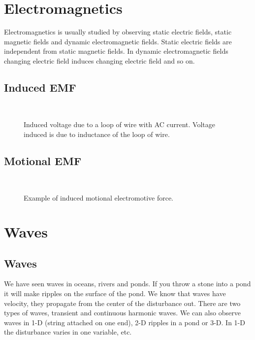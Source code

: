 \section{Electromagnetics}


Electromagnetics is usually studied by observing static electric fields, static magnetic fields and dynamic electromagnetic fields. Static electric fields are independent from static magnetic fields. In dynamic electromagnetic fields changing electric field induces changing electric field and so on. 



\subsection{Induced EMF}


\begin{figure}[htbp]
\begin{center}
\strut{} \\
\end{center}
\caption{Induced voltage due to a loop of wire with AC current. Voltage induced is due to inductance of the loop of wire.}
\label{wind}
\end{figure}



\subsection{Motional EMF}



\begin{figure}[htbp]
\begin{center}
\strut{} \\
\end{center}
\caption{Example of induced motional electromotive force.}
\label{wind}
\end{figure}






\section{Waves}
\subsection{Waves}

We have seen waves in oceans, rivers and ponds. If you throw a stone into a pond it will make ripples on the surface of the pond. We know that waves have velocity, they propagate from the center of the disturbance out. There are two types of waves, transient and continuous harmonic waves. We can also observe waves in 1-D (string attached on one end), 2-D ripples in a pond or 3-D. In 1-D the disturbance varies in one variable, etc. 

